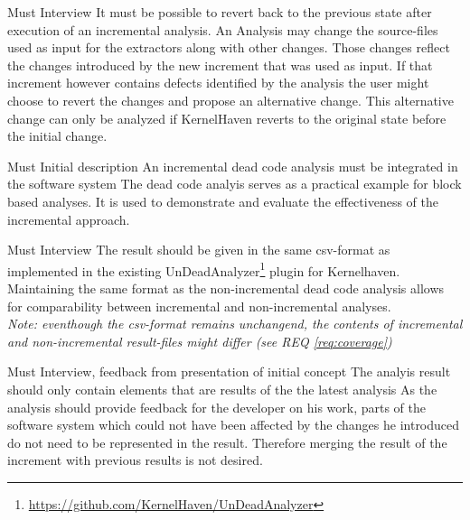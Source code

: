 \documentclass[a4paper]{article}
\begin{document}
\begin{req} \label{req:rollback}
\reqtable
	{Must}  {Interview}
	{It must be possible to revert back to the previous state after execution of an incremental analysis.}
	{An Analysis may change the source-files used as input for the extractors along with other changes. Those changes reflect the changes introduced by the new increment that was used as input. If that increment however contains defects identified by the analysis the user might choose to revert the changes and propose an alternative change. This alternative change can only be analyzed if KernelHaven reverts to the original state before the initial change.}

\end{req}

\begin{req} 
\reqtable
	{Must}  {Initial description}
	{An incremental dead code analysis must be integrated in the software system}
	{The dead code analyis serves as a practical example for block based analyses. It is used to demonstrate and evaluate the effectiveness of the incremental approach.}
	
	

	
	\begin{subreq} \label{req:format}
    \reqtable
    {Must}  {Interview}
	{The result should be given in the same csv-format as implemented in the existing UnDeadAnalyzer\footnote{\url{https://github.com/KernelHaven/UnDeadAnalyzer}} plugin for Kernelhaven.}
	{Maintaining the same format as the non-incremental dead code analysis allows for comparability between incremental and non-incremental analyses. \\
	\emph{Note: eventhough the csv-format remains unchangend, the contents of incremental and non-incremental result-files might differ (see REQ \ref{req:coverage})}}
	\end{subreq}
	
	\begin{subreq} \label{req:coverage}
    \reqtable
    {Must}  {Interview, feedback from presentation of initial concept}
	{The analyis result should only contain elements that are results of the the latest analysis}
	{As the analysis should provide feedback for the developer on his work, parts of the software system which could not have been affected by the changes he introduced do not need to be represented in the result. Therefore merging the result of the increment with previous results is not desired.}
	\end{subreq}
\end{req}
\end{document}
